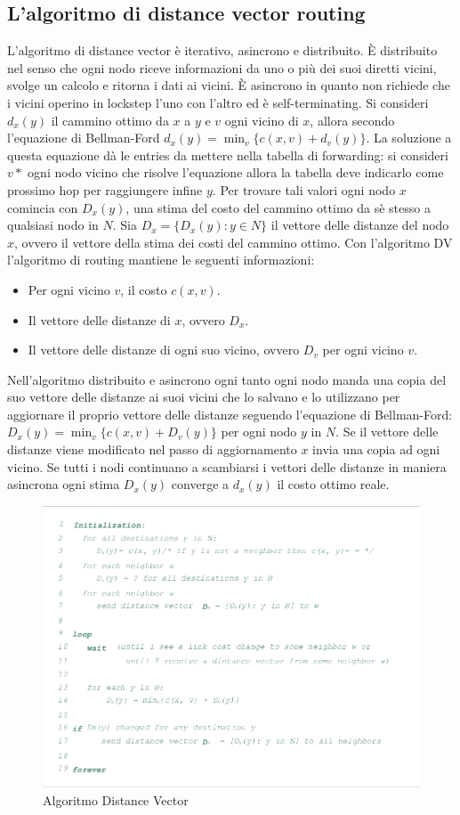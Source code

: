 \subsection{L'algoritmo di distance vector routing}
L'algoritmo di distance vector \`e iterativo, asincrono e distribuito. \`E distribuito nel senso che ogni nodo riceve informazioni da uno o pi\`u dei suoi
diretti vicini, svolge un calcolo e ritorna i dati ai vicini. \`E asincrono in quanto non richiede che i vicini operino in lockstep l'uno con l'altro ed \`e
self-terminating. Si consideri $d_x(y)$ il cammino ottimo da $x$ a $y$ e $v$ ogni vicino di $x$, allora secondo l'equazione di Bellman-Ford $d_x(y)=\min_v
\{c(x, v)+d_v(y)\}$. La soluzione a questa equazione d\`a le entries da mettere nella tabella di forwarding: si consideri $v*$ ogni nodo vicino che risolve
l'equazione allora la tabella deve indicarlo come prossimo hop per raggiungere infine $y$. Per trovare tali valori ogni nodo $x$ comincia con $D_x(y)$, una
stima del costo del cammino ottimo da s\`e stesso a qualsiasi nodo in $N$. Sia $D_x=\{D_x(y):y\in N\}$ il vettore delle distanze del nodo $x$, ovvero il
vettore della stima dei costi del cammino ottimo. Con l'algoritmo DV l'algoritmo di routing mantiene le seguenti informazioni:
\begin{itemize}
\item Per ogni vicino $v$, il costo $c(x, v)$.
\item Il vettore delle distanze di $x$, ovvero $D_x$.
\item Il vettore delle distanze di ogni suo vicino, ovvero $D_v$ per ogni vicino $v$.
\end{itemize}
Nell'algoritmo distribuito e asincrono ogni tanto ogni nodo manda una copia del suo vettore delle distanze ai suoi vicini che lo salvano e lo utilizzano
per aggiornare il proprio vettore delle distanze seguendo l'equazione di Bellman-Ford: $D_x(y)=\min_v\{c(x, v)+D_v(y)\}$ per ogni nodo $y$ in $N$. Se il 
vettore delle distanze viene modificato nel passo di aggiornamento $x$ invia una copia ad ogni vicino. Se tutti i nodi continuano a scambiarsi i vettori 
delle distanze in maniera asincrona ogni stima $D_x(y)$ converge a $d_x(y)$ il costo ottimo reale. 
\begin{figure}[h]
\includegraphics[width=\textwidth]{Pictures/AlgoritmoDV.png}
\caption{Algoritmo Distance Vector}
\end{figure}
